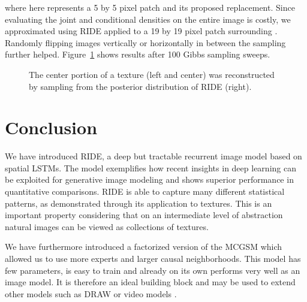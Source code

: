 \documentclass{article}
\begin{document}
		where here  represents a 5 by 5 pixel patch and  its
		proposed replacement. Since evaluating the joint and conditional densities on the entire image is
		costly, we approximated  using RIDE applied to a 19 by 19 pixel patch surrounding .
		Randomly flipping images vertically or horizontally in between the sampling further helped.
		Figure~\ref{fig:inpainting} shows results after 100 Gibbs sampling sweeps.
		\vspace{-.15cm}
		\begin{figure}
			\vspace{-.2cm}
			\centering
 			\vspace{-.6cm}
			\caption{The center portion of a texture (left and center) was reconstructed by sampling from the
			posterior distribution of RIDE (right).}
			\label{fig:inpainting}
		\end{figure}

	\section{Conclusion}
		We have introduced RIDE, a deep but tractable recurrent image model based on spatial LSTMs.
		The model exemplifies how recent insights in deep learning can be exploited for generative
		image modeling and shows superior performance in quantitative comparisons. RIDE is able to capture many
		different statistical patterns, as demonstrated through its application to textures. This is an
		important property considering that on an intermediate level of abstraction natural images
		can be viewed as collections of textures.

		We have furthermore introduced a factorized version of
		the MCGSM which allowed us to use more experts and larger causal neighborhoods. This
		model has few parameters, is easy to train and already on its own performs very
		well as an image model. It is therefore an ideal building block and may be used to extend other models such as DRAW
		\cite{Gregor:2015} or video models \cite{Ranzato:2014,Srivastava:2015}.
\end{document}
